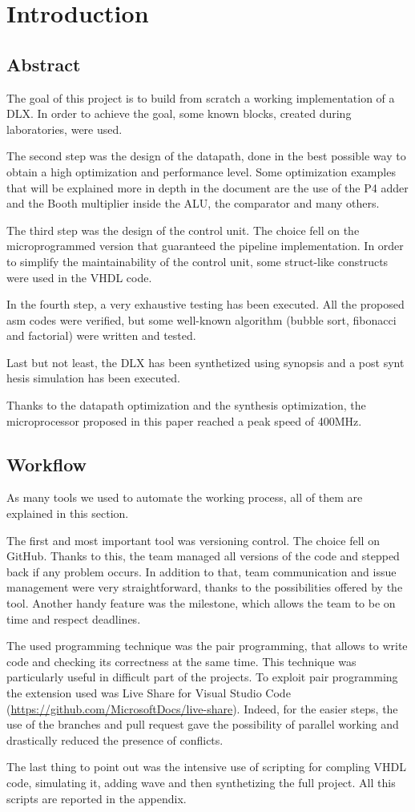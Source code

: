 \chapter{Introduction}

\section{Abstract}
The goal of this project is to build from scratch a working implementation of a DLX. In order to achieve the goal, some known blocks, created during laboratories, were used. 

The second step was the design of the datapath, done in the best possible way to obtain a high optimization and performance level. Some optimization examples that will be explained more in depth in the document are the use of the P4 adder and the Booth multiplier inside the ALU, the comparator and many others. 

The third step was the design of the control unit. The choice fell on the microprogrammed version that guaranteed the pipeline implementation. In order to simplify the maintainability of the control unit, some struct-like constructs were used in the VHDL code. 

In the fourth step, a very exhaustive testing has been executed. All the proposed asm codes were verified, but some well-known algorithm (bubble sort, fibonacci and factorial) were written and tested.

Last but not least, the DLX has been synthetized using synopsis and a post synt
hesis simulation has been executed. 

Thanks to the datapath optimization and the synthesis optimization, the microprocessor proposed in this paper reached a peak speed of 400MHz.  
\section{Workflow}
As many tools we used to automate the working process, all of them are explained in this section.

The first and most important tool was versioning control. The choice fell on GitHub. Thanks to this, the team managed all versions of the code and stepped back if any problem occurs. In addition to that, team communication and issue management were very straightforward, thanks to the possibilities offered by the tool. Another handy feature was the milestone, which allows the team to be on time and respect deadlines. 

The used programming technique was the pair programming, that allows to write code and checking its correctness at the same time. This technique was particularly useful in difficult part of the projects. To exploit pair programming the extension used was Live Share for Visual Studio Code (\url{https://github.com/MicrosoftDocs/live-share}). Indeed, for the easier steps, the use of the branches and pull request gave the possibility of parallel working and drastically reduced the presence of conflicts. 

The last thing to point out was the intensive use of scripting for compling VHDL code, simulating it, adding wave and then synthetizing the full project. All this scripts are reported in the appendix.